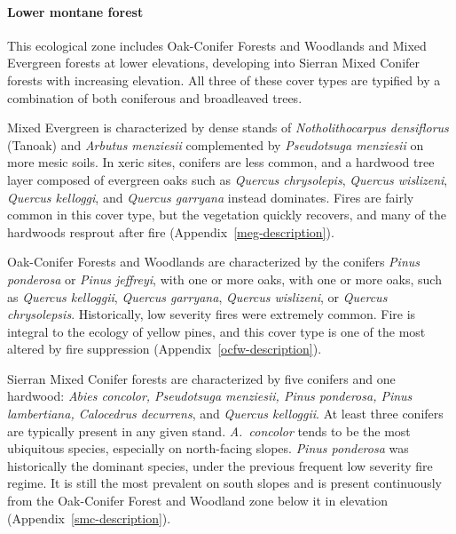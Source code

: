 \paragraph{Lower montane forest} This ecological zone includes Oak-Conifer Forests and Woodlands and Mixed Evergreen forests at lower elevations, developing into Sierran Mixed Conifer forests with increasing elevation. All three of these cover types are typified by a combination of both coniferous and broadleaved trees. 

Mixed Evergreen is characterized by dense stands of \emph{Notholithocarpus densiflorus} (Tanoak) and \emph{Arbutus menziesii} complemented by \emph{Pseudotsuga menziesii} on more mesic soils. In xeric sites, conifers are less common, and a hardwood tree layer composed of evergreen oaks such as \emph{Quercus chrysolepis}, \emph{Quercus wislizeni}, \emph{Quercus kelloggi}, and \emph{Quercus garryana} instead dominates. Fires are fairly common in this cover type, but the vegetation quickly recovers, and many of the hardwoods resprout after fire (Appendix~\ref{meg-description}). 

Oak-Conifer Forests and Woodlands are characterized by the conifers \emph{Pinus ponderosa} or \emph{Pinus jeffreyi}, with one or more oaks, with one or more oaks, such as \emph{Quercus kelloggii}, \emph{Quercus garryana}, \emph{Quercus wislizeni}, or \emph{Quercus chrysolepsis}. Historically, low severity fires were extremely common. Fire is integral to the ecology of yellow pines, and this cover type is one of the most altered by fire suppression (Appendix~\ref{ocfw-description}).

Sierran Mixed Conifer forests are characterized by five conifers and one hardwood: \emph{Abies concolor, Pseudotsuga menziesii, Pinus ponderosa, Pinus lambertiana, Calocedrus decurrens}, and \emph{Quercus kelloggii}. At least three conifers are typically present in any given stand. \emph{A.~concolor} tends to be the most ubiquitous species, especially on north-facing slopes. \emph{Pinus ponderosa} was historically the dominant species, under the previous frequent low severity fire regime. It is still the most prevalent on south slopes and is present continuously from the Oak-Conifer Forest and Woodland zone below it in elevation (Appendix~\ref{smc-description}).


